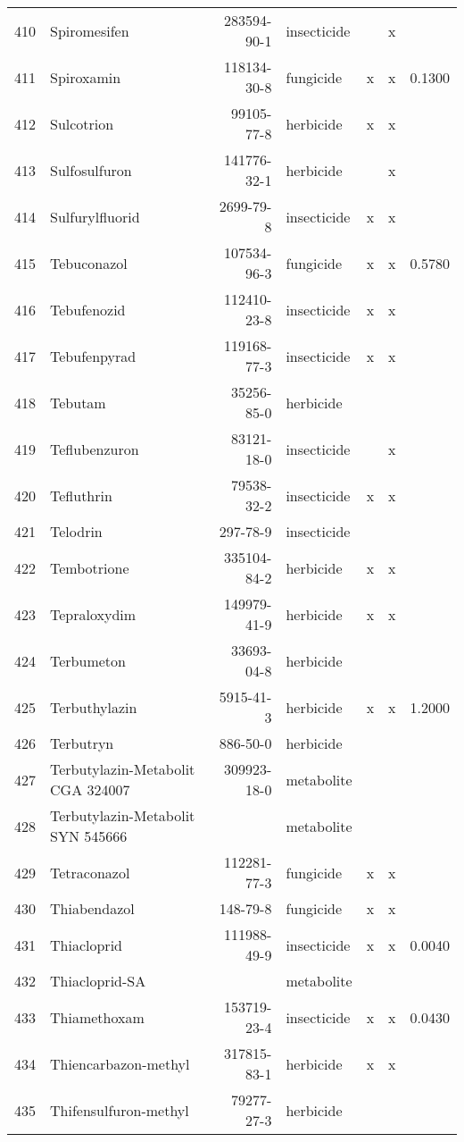\begin{longtable}{lp{4cm}rlp{1.3cm}p{1.3cm}p{1.5cm}}
  410 & Spiromesifen & 283594-90-1 & insecticide &  & x &  \\ 
  411 & Spiroxamin & 118134-30-8 & fungicide & x & x & 0.1300 \\ 
  412 & Sulcotrion & 99105-77-8 & herbicide & x & x &  \\ 
  413 & Sulfosulfuron & 141776-32-1 & herbicide &  & x &  \\ 
  414 & Sulfurylfluorid & 2699-79-8 & insecticide & x & x &  \\ 
  415 & Tebuconazol & 107534-96-3 & fungicide & x & x & 0.5780 \\ 
  416 & Tebufenozid & 112410-23-8 & insecticide & x & x &  \\ 
  417 & Tebufenpyrad & 119168-77-3 & insecticide & x & x &  \\ 
  418 & Tebutam & 35256-85-0 & herbicide &  &  &  \\ 
  419 & Teflubenzuron & 83121-18-0 & insecticide &  & x &  \\ 
  420 & Tefluthrin & 79538-32-2 & insecticide & x & x &  \\ 
  421 & Telodrin & 297-78-9 & insecticide &  &  &  \\ 
  422 & Tembotrione & 335104-84-2 & herbicide & x & x &  \\ 
  423 & Tepraloxydim & 149979-41-9 & herbicide & x & x &  \\ 
  424 & Terbumeton & 33693-04-8 & herbicide &  &  &  \\ 
  425 & Terbuthylazin & 5915-41-3 & herbicide & x & x & 1.2000 \\ 
  426 & Terbutryn & 886-50-0 & herbicide &  &  &  \\ 
  427 & Terbutylazin-Metabolit CGA 324007 & 309923-18-0 & metabolite &  &  &  \\ 
  428 & Terbutylazin-Metabolit SYN 545666 &  & metabolite &  &  &  \\ 
  429 & Tetraconazol & 112281-77-3 & fungicide & x & x &  \\ 
  430 & Thiabendazol & 148-79-8 & fungicide & x & x &  \\ 
  431 & Thiacloprid & 111988-49-9 & insecticide & x & x & 0.0040 \\ 
  432 & Thiacloprid-SA &  & metabolite &  &  &  \\ 
  433 & Thiamethoxam & 153719-23-4 & insecticide & x & x & 0.0430 \\ 
  434 & Thiencarbazon-methyl & 317815-83-1 & herbicide & x & x &  \\ 
  435 & Thifensulfuron-methyl & 79277-27-3 & herbicide &  &  &  \\ 

\end{longtable}
